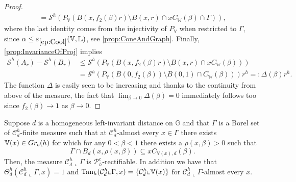 \documentclass[10pt, a4paper,
oneside, headinclude,footinclude]{scrartcl}
\begin{document}
\begin{proof}
\begin{equation}
\begin{split}
           =\mathcal{S}^h(P_\mathbb{V}(B(x,f_2(\beta)r)\setminus B(x,r)\cap xC_\mathbb{W}(\beta)\cap \Gamma)),
       \end{split}
   \end{equation}
   where the last identity comes from the injectivity of $P_\mathbb{V}$ when restricted to $\Gamma$, since $\alpha\leq\oldep{ep:Cool}(\mathbb V,\mathbb L)$, see \cref{prop:ConeAndGraph}. Finally, \cref{prop:InvarianceOfProj} implies
   \begin{equation}
       \begin{split}
            \mathcal{S}^h(A_r)-\mathcal{S}^h(B_r)
           &\leq\mathcal{S}^h(P_\mathbb{V}(B(x,f_2(\beta)r)\setminus B(x,r)\cap xC_\mathbb{W}(\beta)))\\
           &=\mathcal{S}^h(P_\mathbb{V}(B(0,f_2(\beta))\setminus B(0,1)\cap C_\mathbb{W}(\beta)))r^h=:\Delta(\beta)r^h.
       \end{split}
   \end{equation}
   The function $\Delta$ is easily seen to be increasing and thanks to the continuity from above of the measure, the fact that
   $\lim_{\beta\to 0}\Delta(\beta)=0$ immediately follows too since $f_2(\beta)\to 1$ as $\beta\to 0$.
\end{proof}




\begin{proposizione}\label{prop:rett.1}
Suppose $d$ is a homogeneous left-invariant distance on $\mathbb{G}$ and that $\Gamma$ is a Borel set of $\mathcal{C}^h_d$-finite measure such that at $\mathcal{C}^h_d$-almost every $x\in \Gamma$ there exists $\mathbb V(x)\in Gr_c(h)$ for which for any $0<\beta<1$ there exists a $\rho(x,\beta)>0$ such that
\begin{equation}
\Gamma\cap B_d(x,\rho(x,\beta))\subseteq xC_{\mathbb{V}(x),d}(\beta). 
\label{eq:num1}
\end{equation}
Then, the measure $\mathcal{C}^h_d\llcorner \Gamma$ is $\mathscr{P}_h^c$-rectifiable. In addition we have that $\Theta^h_d(\mathcal{C}^h_d\llcorner \Gamma,x)=1$  and $\mathrm{Tan}_h(\mathcal{C}^h_d\llcorner \Gamma,x)=\{\mathcal{C}^h_d\llcorner \mathbb{V}(x)\}$ for $\mathcal{C}^h_d\llcorner \Gamma$-almost every $x$.
\end{proposizione}
\end{document}
